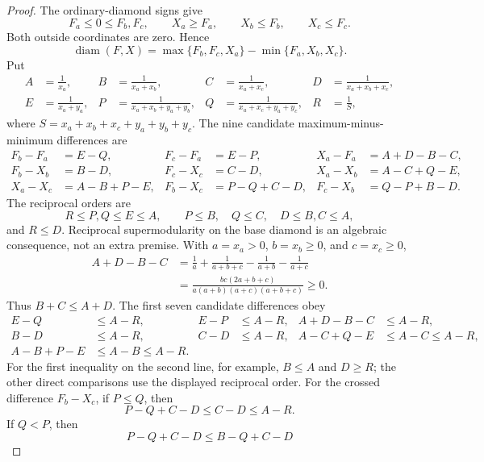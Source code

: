 \documentclass[11pt]{article}
\theoremstyle{definition}
\begin{document}
\begin{proof}
The ordinary-diamond signs give
\begin{equation}
  F_a\le0\le F_b,F_c,
  \qquad
  X_a\ge F_a,
  \qquad
  X_b\le F_b,
  \qquad
  X_c\le F_c.
\end{equation}
Both outside coordinates are zero.  Hence
\begin{equation}\label{eq:conditioned-exact-diameter}
  \operatorname{diam}(F,X)
  =
  \max\{F_b,F_c,X_a\}
  -
  \min\{F_a,X_b,X_c\}.
\end{equation}
Put
\begin{align}
  A&=\frac1{x_a},&
  B&=\frac1{x_a+x_b},&
  C&=\frac1{x_a+x_c},&
  D&=\frac1{x_a+x_b+x_c},\\
  E&=\frac1{x_a+y_a},&
  P&=\frac1{x_a+x_b+y_a+y_b},&
  Q&=\frac1{x_a+x_c+y_a+y_c},&
  R&=\frac1S,
\end{align}
where $S=x_a+x_b+x_c+y_a+y_b+y_c$.  The nine candidate
maximum-minus-minimum differences are
\begin{align}
  F_b-F_a&=E-Q,&
  F_c-F_a&=E-P,&
  X_a-F_a&=A+D-B-C,\\
  F_b-X_b&=B-D,&
  F_c-X_c&=C-D,&
  X_a-X_b&=A-C+Q-E,\\
  X_a-X_c&=A-B+P-E,&
  F_b-X_c&=P-Q+C-D,&
  F_c-X_b&=Q-P+B-D.
\end{align}
The reciprocal orders are
\begin{equation}
  R\le P,Q\le E\le A,
  \qquad
  P\le B,\quad Q\le C,\quad D\le B,C\le A,
\end{equation}
and $R\le D$.  Reciprocal supermodularity on the base diamond is an algebraic consequence, not an
extra premise.  With $a=x_a>0$, $b=x_b\ge0$, and $c=x_c\ge0$,
\begin{align}
  A+D-B-C
  &=
  \frac1a+\frac1{a+b+c}-\frac1{a+b}-\frac1{a+c}\\
  &=
  \frac{bc(2a+b+c)}
       {a(a+b)(a+c)(a+b+c)}
  \ge0.
\end{align}
Thus $B+C\le A+D$.  The first seven candidate differences obey
\begin{align*}
  E-Q&\le A-R,&
  E-P&\le A-R,&
  A+D-B-C&\le A-R,\\
  B-D&\le A-R,&
  C-D&\le A-R,&
  A-C+Q-E&\le A-C\le A-R,\\
  A-B+P-E&\le A-B\le A-R.
\end{align*}
For the first inequality on the second line, for example, $B\le A$ and $D\ge R$; the other direct
comparisons use the displayed reciprocal order.  For the crossed difference $F_b-X_c$, if
$P\le Q$, then
\[
  P-Q+C-D\le C-D\le A-R.
\]
If $Q<P$, then
\[
  P-Q+C-D
  \le B-Q+C-D
\]
\end{proof}
\end{document}
